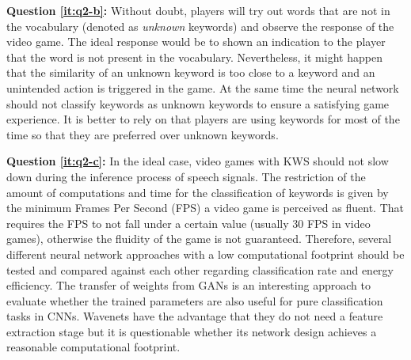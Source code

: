 \textbf{Question \ref{it:q2-b}:} 
Without doubt, players will try out words that are not in the vocabulary (denoted as \emph{unknown} keywords) and observe the response of the video game.
The ideal response would be to shown an indication to the player that the word is not present in the vocabulary. 
Nevertheless, it might happen that the similarity of an unknown keyword is too close to a keyword and an unintended action is triggered in the game. 
At the same time the neural network should not classify keywords as unknown keywords to ensure a satisfying game experience.
It is better to rely on that players are using keywords for most of the time so that they are preferred over unknown keywords.

\textbf{Question \ref{it:q2-c}:}
In the ideal case, video games with KWS should not slow down during the inference process of speech signals.
The restriction of the amount of computations and time for the classification of keywords is given by the minimum Frames Per Second (FPS) a video game is perceived as fluent.
That requires the FPS to not fall under a certain value (usually 30 FPS in video games), otherwise the fluidity of the game is not guaranteed.
Therefore, several different neural network approaches with a low computational footprint should be tested and compared against each other regarding classification rate and energy efficiency.
The transfer of weights from GANs is an interesting approach to evaluate whether the trained parameters are also useful for pure classification tasks in CNNs.
Wavenets have the advantage that they do not need a feature extraction stage but it is questionable whether its network design achieves a reasonable computational footprint.



